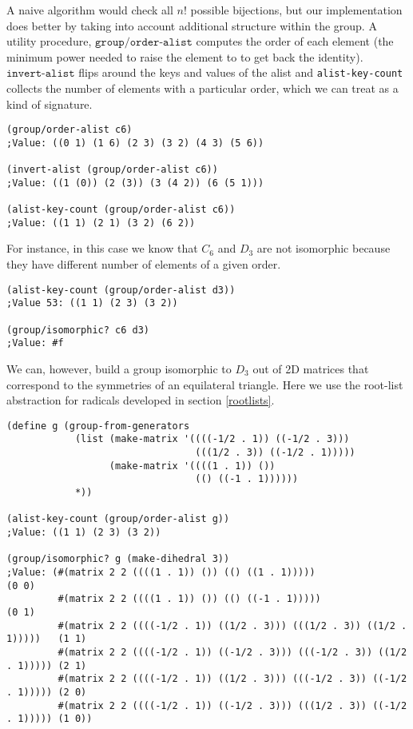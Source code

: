 \documentclass{article}
\begin{document}
		A naive algorithm would check all $n!$ possible bijections, but our implementation does better by taking into account additional structure within the group. A utility procedure, $\texttt{group/order-alist}$ computes the order of each element (the minimum power needed to raise the element to to get back the identity). $\texttt{invert-alist}$ flips around the keys and values of the alist and \texttt{alist-key-count} collects the number of elements with a particular order, which we can treat as a kind of signature.
		
\begin{verbatim}
(group/order-alist c6)
;Value: ((0 1) (1 6) (2 3) (3 2) (4 3) (5 6))

(invert-alist (group/order-alist c6))
;Value: ((1 (0)) (2 (3)) (3 (4 2)) (6 (5 1)))

(alist-key-count (group/order-alist c6))
;Value: ((1 1) (2 1) (3 2) (6 2))
\end{verbatim}
		
		For instance, in this case we know that $C_{6}$ and $D_3$ are not isomorphic because they have different number of elements of a given order.

\begin{verbatim}
(alist-key-count (group/order-alist d3))
;Value 53: ((1 1) (2 3) (3 2))

(group/isomorphic? c6 d3)
;Value: #f
\end{verbatim}

		We can, however, build a group isomorphic to $D_3$ out of 2D matrices that correspond to the symmetries of an equilateral triangle. Here we use the root-list abstraction for radicals developed in section \ref{rootlists}.
		
\begin{verbatim}
(define g (group-from-generators
     	    (list (make-matrix '((((-1/2 . 1)) ((-1/2 . 3)))
				                 (((1/2 . 3)) ((-1/2 . 1)))))
		          (make-matrix '((((1 . 1)) ())
				                 (() ((-1 . 1))))))
	        *))

(alist-key-count (group/order-alist g))
;Value: ((1 1) (2 3) (3 2))

(group/isomorphic? g (make-dihedral 3))
;Value: (#(matrix 2 2 ((((1 . 1)) ()) (() ((1 . 1)))))                          (0 0) 
         #(matrix 2 2 ((((1 . 1)) ()) (() ((-1 . 1)))))                         (0 1) 
         #(matrix 2 2 ((((-1/2 . 1)) ((1/2 . 3))) (((1/2 . 3)) ((1/2 . 1)))))   (1 1)
         #(matrix 2 2 ((((-1/2 . 1)) ((-1/2 . 3))) (((-1/2 . 3)) ((1/2 . 1))))) (2 1) 
         #(matrix 2 2 ((((-1/2 . 1)) ((1/2 . 3))) (((-1/2 . 3)) ((-1/2 . 1))))) (2 0) 
         #(matrix 2 2 ((((-1/2 . 1)) ((-1/2 . 3))) (((1/2 . 3)) ((-1/2 . 1))))) (1 0))
\end{verbatim}
		
\end{document}
